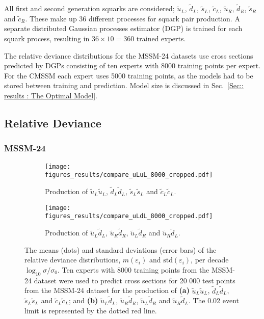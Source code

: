 \documentclass[twoside,english]{uiofysmaster}
\begin{document}
{{All first and second generation squarks are considered; $\widetilde{u}_L$, $\widetilde{d}_L$, $\widetilde{s}_L$, $\widetilde{c}_L$, $\widetilde{u}_R$, $\widetilde{d}_R$, $\widetilde{s}_R$ and $\widetilde{c}_R$. These make up 36 different processes for squark pair production. A separate distributed Gaussian processes estimator (DGP) is trained for each squark process, resulting in $36 \times 10 = 360$ trained experts. 

The relative deviance distributions for the MSSM-24 datasets use cross sections predicted by DGPs consisting of ten experts with 8000 training points per expert. For the CMSSM each expert uses 5000 training points, as the models had to be stored between training and prediction. Model size is discussed in Sec.~\ref{Sec:: results : The Optimal Model}.

\subsection{Relative Deviance}\label{Sec:: results : Relative Deviance}




\subsubsection{MSSM-24}

\begin{figure}
    \centering
    \begin{subfigure}[b]{1\textwidth}
        \texttt{[image: figures\_results/compare\_uLuL\_8000\_cropped.pdf]}
        \caption{Production of $\widetilde{u}_L \widetilde{u}_L$, $\widetilde{d}_L \widetilde{d}_L$, $\widetilde{s}_L \widetilde{s}_L$ and $\widetilde{c}_L \widetilde{c}_L$.}
        \label{Fig:: results : RD MSSM-24 uLuL}
    \end{subfigure}
    \begin{subfigure}[b]{1\textwidth}
        \texttt{[image: figures\_results/compare\_uLdL\_8000\_cropped.pdf]}
        \caption{Production of $\widetilde{u}_L\widetilde{d}_L$, $\widetilde{u}_R\widetilde{d}_R$, $\widetilde{u}_L\widetilde{d}_R$ and $\widetilde{u}_R\widetilde{d}_L$.}
        \label{Fig :: results : RD MSSM-24 uLdL}
    \end{subfigure}
    \caption{The means (dots) and standard deviations (error bars) of the relative deviance distributions, $m(\varepsilon_i)$ and $\mathrm{std}(\varepsilon_i)$, per decade $\log_{10} \sigma / \sigma_0$. Ten experts with 8000 training points from the MSSM-24 dataset were used to predict cross sections for 20 000 test points from the MSSM-24 dataset for the production of \textbf{(a)}  $\widetilde{u}_L \widetilde{u}_L$, $\widetilde{d}_L \widetilde{d}_L$, $\widetilde{s}_L \widetilde{s}_L$ and $\widetilde{c}_L \widetilde{c}_L$; and \textbf{(b)} $\widetilde{u}_L\widetilde{d}_L$, $\widetilde{u}_R\widetilde{d}_R$, $\widetilde{u}_L\widetilde{d}_R$ and $\widetilde{u}_R\widetilde{d}_L$. The 0.02 event limit is represented by the dotted red line.}
\label{Fig:: results : RD MSSM-24}
\end{figure}

}}
\end{document}
